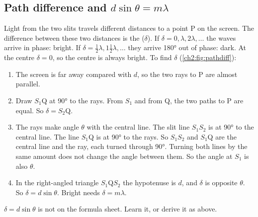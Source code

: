 \subsection{Path difference and \texorpdfstring{$d\sin\theta = m\lambda$}{d sin(theta) = m lambda}}
Light from the two slits travels different distances to a point P on the screen. The
difference between these two distances is the  ($\delta$). If
$\delta = 0, \lambda, 2\lambda, \ldots$ the waves arrive in phase: bright. If
$\delta = \tfrac{1}{2}\lambda, 1\tfrac{1}{2}\lambda, \ldots$ they arrive \ang{180} out of
phase: dark. At the centre $\delta = 0$, so the centre is always bright. To find $\delta$
(\cref{ch2:fig:pathdiff}):
\begin{enumerate}
  \item The screen is far away compared with $d$, so the two rays to P are almost parallel.
  \item Draw $S_1$Q at \ang{90} to the rays. From $S_1$ and from Q, the two paths to P
        are equal. So $\delta = S_2$Q.
  \item The rays make angle $\theta$ with the central line. The slit line $S_1S_2$ is at
        \ang{90} to the central line. The line $S_1$Q is at \ang{90} to the rays. So
        $S_1S_2$ and $S_1$Q are the central line and the ray, each turned through
        \ang{90}. Turning both lines by the same amount does not change the angle between
        them. So the angle at $S_1$ is also $\theta$.
  \item In the right-angled triangle $S_1$Q$S_2$ the hypotenuse is $d$, and $\delta$ is
        opposite $\theta$. So $\delta = d\sin\theta$. Bright needs $\delta = m\lambda$.
\end{enumerate}
$\delta = d\sin\theta$ is not on the formula sheet. Learn it, or derive it as above.

